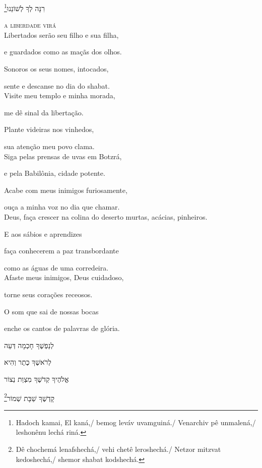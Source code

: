 \footnote{Hadoch kamai, El kaná,/ bemog leváv uvamguiná./ Venarchiv pê unmalená,/ leshonênu lechá riná.}רִנָּה לְךָ לְשׁוֹנֵנוּ


\movetooddpage
\raggedright

\vspace*{1cm}

\textsc{a liberdade virá}\\[15pt]


Libertados serão seu filho e sua filha,

e guardados como as maçãs dos olhos.

Sonoros os seus nomes, intocados,

sente e descanse no dia do shabat.\\[10pt]


Visite meu templo e minha morada,

me dê sinal da libertação.

Plante videiras nos vinhedos,

sua atenção meu povo clama.\\[10pt]


Siga pelas prensas de uvas em Botzrá,

e pela Babilônia, cidade potente.

Acabe com meus inimigos furiosamente,

ouça a minha voz no dia que chamar.\\[10pt]


Deus, faça crescer na colina do deserto murtas, acácias, pinheiros.

E aos sábios e aprendizes

faça conhecerem a paz transbordante

como as águas de uma corredeira.\\[10pt]


Afaste meus inimigos, Deus cuidadoso,

torne seus corações receosos.

O som que sai de nossas bocas

enche os cantos de palavras de glória.


\movetoevenpage
\raggedleft %

\vspace*{1cm}

לְנַפְשֶׁךָ חָכְמָה דְּעֵה

לְרֹאשֶׁךָ כֶתֶר וְהִיא

אֱלֹהֶיךָ קְדֹשֶׁךָ מִצְוַת נְצוֹר

\footnote{Dê chochemá lenafshechá,/ vehi chetê leroshechá./ Netzor mitzvat kedoshechá,/ shemor shabat kodshechá.}קָדְשֶׁךָ שַׁבָּת שְׁמוֹר 

